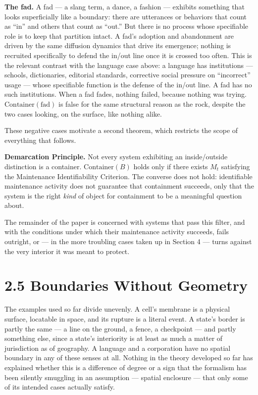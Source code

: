 \documentclass[11pt]{article}
\theoremstyle{plain}
\begin{document}
\textbf{The fad.} A fad --- a slang term, a dance, a fashion --- exhibits something that looks superficially like a boundary: there are utterances or behaviors that count as ``in'' and others that count as ``out.'' But there is no process whose specifiable role is to keep that partition intact. A fad's adoption and abandonment are driven by the same diffusion dynamics that drive its emergence; nothing is recruited specifically to defend the in/out line once it is crossed too often. This is the relevant contrast with the language case above: a language has institutions --- schools, dictionaries, editorial standards, corrective social pressure on ``incorrect'' usage --- whose specifiable function is the defense of the in/out line. A fad has no such institutions. When a fad fades, nothing failed, because nothing was trying. \(\mathrm{Container}(\text{fad})\) is false for the same structural reason as the rock, despite the two cases looking, on the surface, like nothing alike.

These negative cases motivate a second theorem, which restricts the scope of everything that follows.

\textbf{Demarcation Principle.} Not every system exhibiting an inside/outside distinction is a container. \(\mathrm{Container}(B)\) holds only if there exists \(M_t\) satisfying the Maintenance Identifiability Criterion. The converse does not hold: identifiable maintenance activity does not guarantee that containment succeeds, only that the system is the right \emph{kind} of object for containment to be a meaningful question about.

The remainder of the paper is concerned with systems that pass this filter, and with the conditions under which their maintenance activity succeeds, fails outright, or --- in the more troubling cases taken up in Section 4 --- turns against the very interior it was meant to protect.

\section*{2.5 Boundaries Without Geometry}

The examples used so far divide unevenly. A cell's membrane is a physical surface, locatable in space, and its rupture is a literal event. A state's border is partly the same --- a line on the ground, a fence, a checkpoint --- and partly something else, since a state's interiority is at least as much a matter of jurisdiction as of geography. A language and a corporation have no spatial boundary in any of these senses at all. Nothing in the theory developed so far has explained whether this is a difference of degree or a sign that the formalism has been silently smuggling in an assumption --- spatial enclosure --- that only some of its intended cases actually satisfy.
\end{document}
